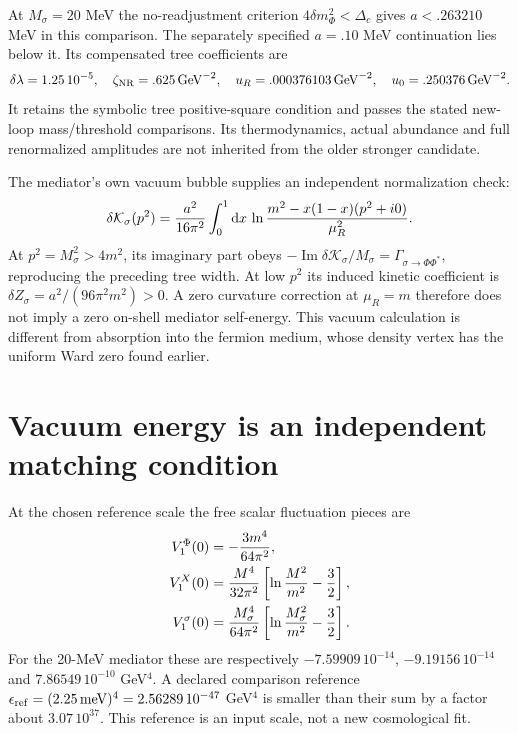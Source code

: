 \documentclass[11pt]{article}
\newcommand{\dd}{\mathrm d}
\begin{document}
At $M_\sigma=20$ MeV the no-readjustment criterion
$4\delta m_\Phi^2<\Delta_c$ gives $a<.263210$ MeV in this comparison.
The separately specified $a=.10$ MeV continuation lies below it. Its
compensated tree coefficients are
\begin{equation}
 \delta\lambda=1.25\,10^{-5},\quad
 \zeta_{\rm NR}=.625\,\mathrm{GeV}^{-2},\quad
 u_R=.000376103\,\mathrm{GeV}^{-2},\quad
 u_0=.250376\,\mathrm{GeV}^{-2}.
\end{equation}
It retains the symbolic tree positive-square condition and passes the
stated new-loop mass/threshold comparisons. Its thermodynamics, actual
abundance and full renormalized amplitudes are not inherited from the
older stronger candidate.

The mediator's own vacuum bubble supplies an independent normalization
check:
\begin{equation}
 \delta\mathcal K_\sigma(p^2)
 ={a^2\over16\pi^2}\int_0^1\dd x\,
 \ln{m^2-x(1-x)(p^2+i0)\over\mu_R^2}.
\end{equation}
At $p^2=M_\sigma^2>4m^2$, its imaginary part obeys
$-\operatorname{Im}\delta\mathcal K_\sigma/M_\sigma
=\Gamma_{\sigma\to\Phi\Phi^*}$, reproducing the preceding tree width.
At low $p^2$ its induced kinetic coefficient is
$\delta Z_\sigma=a^2/(96\pi^2m^2)>0$.
A zero curvature correction at $\mu_R=m$ therefore does not imply a zero
on-shell mediator self-energy.
This vacuum calculation is different from absorption into the fermion
medium, whose density vertex has the uniform Ward zero found earlier.

\section{Vacuum energy is an independent matching condition}
At the chosen reference scale the free scalar fluctuation pieces are
\begin{align}
 V_1^\Phi(0)&=-{3m^4\over64\pi^2},\\
 V_1^X(0)&={M^4\over32\pi^2}
                   \left[\ln{M^2\over m^2}-{3\over2}\right],\\
 V_1^\sigma(0)&={M_\sigma^4\over64\pi^2}
                   \left[\ln{M_\sigma^2\over m^2}-{3\over2}\right].
\end{align}
For the 20-MeV mediator these are respectively
$-7.59909\,10^{-14}$, $-9.19156\,10^{-14}$ and
$7.86549\,10^{-10}$ GeV$^4$. A declared comparison reference
$\epsilon_{\rm ref}=(2.25\,\mathrm{meV})^4=2.56289\,10^{-47}$ GeV$^4$
is smaller than their sum by a factor about $3.07\,10^{37}$.
This reference is an input scale, not a new cosmological fit.
\end{document}
